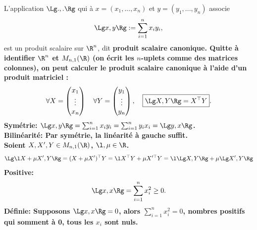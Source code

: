 \documentclass[11pt]{article}
\begin{document}
\begin{prop}{}{}
    L'application $\Lg.,.\Rg$ qui à $x=(x_1,...,x_n)$ et $y=(y_1,...,y_n)$ associe
    \begin{equation*}
        \Lg x,y\Rg := \sum_{i=1}^nx_iy_i,
    \end{equation*}
    est un produit scalaire sur $\R^n$, dit \bf{produit scalaire canonique.}\n
    Quitte à identifier $\R^n$ et $M_{n,1}(\R)$ (on écrit les $n$-uplets comme des matrices colonnes), on peut calculer le produit scalaire canonique à l'aide d'un produit matriciel :
    \begin{equation*}
        \forall X = \begin{pmatrix} x_1 \\ \vdots \\ x_n \end{pmatrix} \quad \forall Y = \begin{pmatrix} y_1 \\ \vdots \\ y_n \end{pmatrix}, \quad \boxed{\Lg X, Y \Rg = X^\top Y}.
    \end{equation*}
    \tcblower
    \bf{Symétrie:} $\Lg x, y \Rg = \sum_{i=1}^nx_iy_i=\sum_{i=1}^ny_ix_i=\Lg y, x\Rg$.\\
    \bf{Bilinéarité:} Par symétrie, la linéarité à gauche suffit.\\
    Soient $X,X',Y\in M_{n,1}(\R)$, $\l,\mu\in\R$.
    \begin{equation*}
        \Lg \l X + \mu X', Y \Rg = ( X + \mu X')^{\top}Y=\l X^{\top}Y + \mu X'^{\top}Y=\l\Lg X,Y \Rg + \mu \Lg X', Y \Rg
    \end{equation*}
    \bf{Positive:}
    \begin{equation*}
        \Lg x, x \Rg = \sum_{i=1}^nx_i^2\geq0.
    \end{equation*}
    \bf{Définie:}
    Supposons $\Lg x,x \Rg=0$, alors $\sum_{i=1}^nx_i^2=0$, nombres positifs qui somment à 0, tous les $x_i$ sont nuls.
\end{prop}
\end{document}
